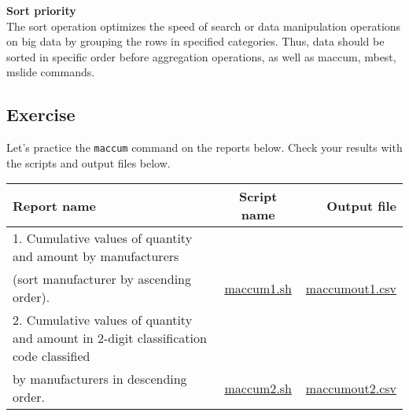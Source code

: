 \vspace {5mm}

{\setlength{\parindent}{0cm}

\textbf{Sort priority}\\


    
The sort operation optimizes the speed of search or data manipulation operations on big data by grouping the rows in specified categories.  Thus, data should be sorted in specific order before aggregation operations, as well as maccum, mbest, mslide commands. \\


}


\subsection{Exercise }

Let's practice the \verb|maccum| command on the reports below. Check your results with the scripts and output files below. 

\begin{table}[htbp]
{\small
\begin{tabular}{ l | c || r }
\hline
\textbf{Report name}   & \textbf{Script name} & \textbf{Output file}  \\
\hline
1. Cumulative values of quantity and amount by manufacturers \\ (sort manufacturer by ascending order). & \href{exercise/maccum1.sh}{maccum1.sh} & \href{exercise/outdat/maccumout1.csv}{maccumout1.csv} \\
2. Cumulative values of quantity and amount in 2-digit classification code classified \\ by manufacturers in descending order. & \href{exercise/maccum2.sh}{maccum2.sh} & \href{exercise/outdat/maccumout2.csv}{maccumout2.csv} \\


\hline
\end{tabular} 
}
\end{table} 


%
